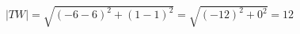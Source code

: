 \documentclass[preview]{standalone}
\begin{document}
\begin{align*}
|TW| = \sqrt{(-6-6)^2 + (1-1)^2} = \sqrt{(-12)^2 + 0^2} = 12
\end{align*}
\end{document}
